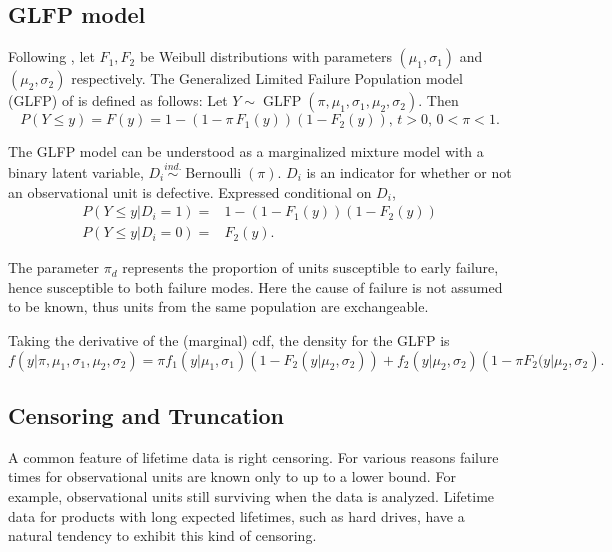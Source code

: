 \documentclass[12pt]{article}
\newcommand{\ind}{\stackrel{ind.}{\sim}}
\newcommand{\op}{\operatorname}
\begin{document}
\subsection{GLFP model}
\label{subsec:GLFP model}
Following \cite{chan}, let $F_1,F_2$ be Weibull distributions with parameters $(\mu_1,\sigma_1)$ and $(\mu_2, \sigma_2)$ respectively.
The Generalized Limited Failure Population model (GLFP) of \citet{chan} is defined as follows: Let $Y \sim \op{GLFP}(\pi, \mu_1,\sigma_1,\mu_2,\sigma_2)$. Then
$$P(Y \le y) = F(y) = 1 - (1-\pi\, F_{1}(y))(1 - F_{2}(y)),\, t>0,\, 0 < \pi < 1.$$

The GLFP model can be understood as a marginalized mixture model with a binary latent variable, $D_i\ind \op{Bernoulli}(\pi)$. $D_i$ is an indicator for whether or not an observational unit is defective. Expressed conditional on $D_i$,
\begin{align*}
P(Y\le y | D_i=1) =& 1 -(1-F_1(y))(1-F_2(y))\\
P(Y\le y | D_i=0) =& F_2(y).
\end{align*}

The parameter $\pi_d$ represents the proportion of units susceptible to early failure, hence susceptible to both failure modes. Here the cause of failure is not assumed to be known, thus units from the same population are exchangeable.

Taking the derivative of the (marginal) cdf, the density for the GLFP is
\begin{equation}
f(y|\pi, \mu_1,\sigma_1, \mu_2, \sigma_2) = \pi f_1(y|\mu_1,\sigma_1)\left(1-F_2(y|\mu_2,\sigma_2)\right) + f_2(y|\mu_2,\sigma_2)\left(1-\pi F_2(y|\mu_2,\sigma_2\right).
\end{equation}

\subsection{Censoring and Truncation}
A common feature of lifetime data is right censoring.  For various reasons failure times for observational units are known only to up to a lower bound. For example, observational units still surviving when the data is analyzed.  Lifetime data for products with long expected lifetimes, such as hard drives, have a natural tendency to exhibit this kind of censoring.\\
\end{document}
